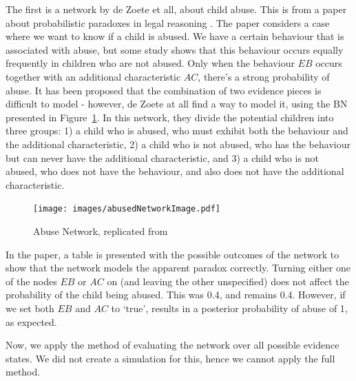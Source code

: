 \documentclass[12pt]{article}
\begin{document}
The first is a network by de Zoete et all, about child abuse. This is from a paper about probabilistic paradoxes in legal reasoning \citep{deZoete2019}. The paper considers a case where we want to know if a child is abused. We have a certain behaviour that is associated with abuse, but some study shows that this behaviour occurs equally frequently in children who are not abused. Only when the behaviour $EB$ occurs together with an additional characteristic $AC$, there's a strong probability of abuse. It has been proposed that the combination of two evidence pieces is difficult to model - however, de Zoete at all find a way to model it, using the BN presented in Figure~\ref{pity}. In this network, they divide the potential children into three groups: 1) a child who is abused, who must exhibit both the behaviour and the additional characteristic, 2) a child who is not abused, who has the behaviour but can never have the additional characteristic, and 3) a child who is not abused, who does not have the behaviour, and also does not have the additional characteristic.
 

 \begin{figure}[htbp]
\begin{center}
\texttt{[image: images/abusedNetworkImage.pdf]}
\caption{Abuse Network, replicated from \citep{deZoete2019}}
\label{pity}
\end{center}
\end{figure}

In the paper, a table is presented with the possible outcomes of the network to show that the network models the apparent paradox correctly. Turning either one of the nodes $EB$ or $AC$ on (and leaving the other unspecified) does not affect the probability of the child being abused. This was 0.4, and remains 0.4. However, if we set both $EB$ and $AC$ to `true', results in a posterior probability of abuse of 1, as expected.

Now, we apply the method of evaluating the network over all possible evidence states. We did not create a simulation for this, hence we cannot apply the full method.
\end{document}
